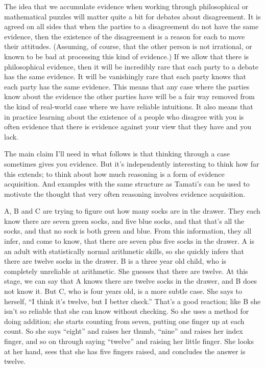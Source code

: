 \documentclass[
  10pt,
  letterpaper,
  twoside]{scrbook}
\begin{document}
The idea that we accumulate evidence when working through philosophical
or mathematical puzzles will matter quite a bit for debates about
disagreement. It is agreed on all sides that when the parties to a
disagreement do not have the same evidence, then the existence of the
disagreement is a reason for each to move their attitudes. (Assuming, of
course, that the other person is not irrational, or known to be bad at
processing this kind of evidence.) If we allow that there is
philosophical evidence, then it will be incredibly rare that each party
to a debate has the same evidence. It will be vanishingly rare that each
party knows that each party has the same evidence. This means that any
case where the parties know about the evidence the other parties have
will be a fair way removed from the kind of real-world case where we
have reliable intuitions. It also means that in practice learning about
the existence of a people who disagree with you is often evidence that
there is evidence against your view that they have and you lack.

The main claim I'll need in what follows is that thinking through a case
sometimes gives you evidence. But it's independently interesting to
think how far this extends; to think about how much reasoning is a form
of evidence acquisition. And examples with the same structure as
{Tamati}'s can be used to motivate the thought that very often reasoning
involves evidence acquisition.

A, B and C are trying to figure out how many socks are in the drawer.
They each know there are seven green socks, and five blue socks, and
that that's all the socks, and that no sock is both green and blue. From
this information, they all infer, and come to know, that there are seven
plus five socks in the drawer. A is an adult with statistically normal
arithmetic skills, so she quickly infers that there are twelve socks in
the drawer. B is a three year old child, who is completely unreliable at
arithmetic. She guesses that there are twelve. At this stage, we can say
that A knows there are twelve socks in the drawer, and B does not know
it. But C, who is four years old, is a more subtle case. She says to
herself, ``I think it's twelve, but I better check.'' That's a good
reaction; like B she isn't so reliable that she can know without
checking. So she uses a method for doing addition; she starts counting
from seven, putting one finger up at each count. So she says ``eight''
and raises her thumb, ``nine'' and raises her index finger, and so on
through saying ``twelve'' and raising her little finger. She looks at
her hand, sees that she has five fingers raised, and concludes the
answer is twelve.
\end{document}
